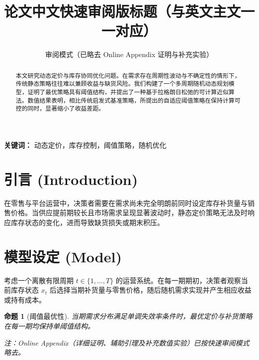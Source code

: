 \documentclass[UTF8, 11pt, a4paper]{ctexart}
\title{\textbf{论文中文快速审阅版标题（与英文主文一一对应）}}
\author{审阅模式（已略去 Online Appendix 证明与补充实验）}
\date{}
\theoremstyle{plain}
\newtheorem{proposition}{命题}
\theoremstyle{definition}
\theoremstyle{remark}
\begin{document}
\maketitle

\begin{abstract}
本文研究动态定价与库存协同优化问题。在需求存在周期性波动与不确定性的情形下，传统静态策略往往难以兼顾收益与缺货风险。我们构建了一个多周期随机动态规划模型，证明了最优策略具有阈值结构，并提出了一种基于拉格朗日松弛的可计算近似算法。数值结果表明，相比传统启发式基准策略，所提出的自适应阈值策略在保持计算可控的同时，显著缩小了收益差距。
\end{abstract}

\noindent\textbf{关键词：} 动态定价，库存控制，阈值策略，随机优化

\section{引言 (Introduction)}
\label{sec:intro}

在零售与平台运营中，决策者需要在需求尚未完全明朗前同时设定库存补货量与销售价格。当供应提前期较长且市场需求呈现显著波动时，静态定价策略无法及时响应库存状态的变化，进而导致缺货损失或期末积压。

\section{模型设定 (Model)}
\label{sec:model}

考虑一个离散有限周期 $t \in \{1, \dots, T\}$ 的运营系统。在每一期期初，决策者观察当前库存状态 $x_t$ 后选择当期补货量与零售价格，随后随机需求实现并产生相应收益或持有成本。

\begin{proposition}[阈值最优性]
\label{prop:threshold}
当期需求分布满足单调失效率条件时，最优定价与补货策略在每一期均保持单阈值结构。
\end{proposition}

\vspace{1em}
\noindent\textit{注：Online Appendix（详细证明、辅助引理及补充数值实验）已按快速审阅模式略去。}
\end{document}
